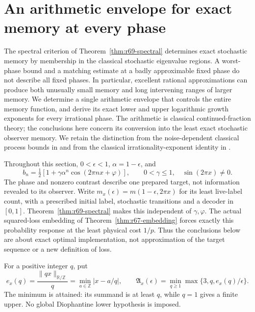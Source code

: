 \section{An arithmetic envelope for exact memory at every phase}\label{sec:r71-arithmetic}
The spectral criterion of Theorem~\ref{thm:r69-spectral} determines exact stochastic memory by membership in the classical stochastic eigenvalue regions. A worst-phase bound and a matching estimate at a badly approximable fixed phase do not describe all fixed phases. In particular, excellent rational approximations can produce both unusually small memory and long intervening ranges of larger memory. We determine a single arithmetic envelope that controls the entire memory function, and derive its exact lower and upper logarithmic growth exponents for every irrational phase. The arithmetic is classical continued-fraction theory; the conclusions here concern its conversion into the least exact stochastic observer memory. We retain the distinction from the noise-dependent classical process bounds in \cite{Fanizza24} and from the classical irrationality-exponent identity in \cite{HoneVarona19}.

Throughout this section, $0<\epsilon<1$, $\alpha=1-\epsilon$, and
\[
 b_n=\tfrac12[1+\gamma\alpha^n\cos(2\pi nx+\varphi)],
 \qquad 0<\gamma\le1,\quad \sin(2\pi x)\ne0.
\]
The phase and nonzero contrast describe one prepared target, not information revealed to its observer. Write $m_x(\epsilon)=m(1-\epsilon,2\pi x)$ for its least live-label count, with a prescribed initial label, stochastic transitions and a decoder in $[0,1]$. Theorem~\ref{thm:r69-spectral} makes this independent of $\gamma,\varphi$. The actual squared-loss embedding of Theorem~\ref{thm:r67-embedding} forces exactly this probability response at the least physical cost $1/p$. Thus the conclusions below are about exact optimal implementation, not approximation of the target sequence or a new definition of loss.

For a positive integer $q$, put
\[
 e_x(q)=\frac{\|qx\|_{\mathbb R/\mathbb Z}}q
       =\min_{a\in\mathbb Z}|x-a/q|,
 \qquad
 \mathfrak A_x(\epsilon)
   =\min_{q\ge1}\max\{3,q,e_x(q)/\epsilon\}.
\]
The minimum is attained: its summand is at least $q$, while $q=1$ gives a finite upper. No global Diophantine lower hypothesis is imposed.

